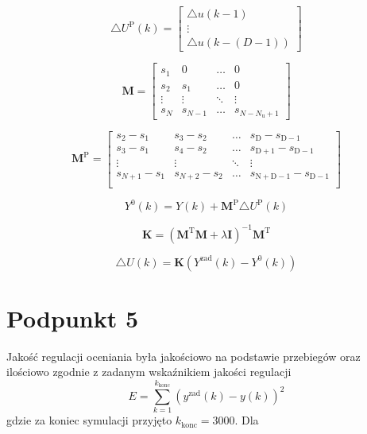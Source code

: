 \begin{equation}
\triangle U^{\mathrm{P}}(k)=\left[
\begin{array}{c}
\triangle u(k-1)\\
\vdots\\
\triangle u(k-(D-1))
\end{array}
\right]
\label{dUp}
\end{equation}

\begin{equation}
\boldsymbol{M}=\left[
\begin{array}
{cccc}
s_{1} & 0 & \ldots & 0\\
s_{2} & s_{1} & \ldots & 0\\
\vdots & \vdots & \ddots & \vdots\\
s_{N} & s_{N-1} & \ldots &  s_{N-N_{\mathrm{u}}+1}
\end{array}
\right]
\label{Marray}
\end{equation}

\begin{equation}
\boldsymbol{M}^{\mathrm{P}}=\left[
\begin{array}
{cccc}
s_{2} - s_{1} & s_{3} - s_{2} & \ldots & s_{\mathrm{D}} - s_{\mathrm{D-1}}\\
s_{3} - s_{1} & s_{4} - s_{2} & \ldots & s_{\mathrm{D+1}} - s_{\mathrm{D-1}}\\
\vdots & \vdots & \ddots & \vdots\\
s_{N+1} - s_{1} & s_{N+2} - s_{2} & \ldots & s_{\mathrm{N+D-1}} - s_{\mathrm{D-1}}\\
\end{array}
\right]
\label{MParray}
\end{equation}

\begin{equation}
Y^{0}(k) = Y(k) + \boldsymbol{M}^{\mathrm{P}} \triangle U^{\mathrm{P}}(k)
\label{Y0k}
\end{equation}

\begin{equation}
\boldsymbol{K} = (\boldsymbol{M}^{\mathrm{T}} \boldsymbol{M} + \lambda \boldsymbol{I})^{-1} \boldsymbol{M}^{\mathrm{T}}
\label{Karray}
\end{equation}

\begin{equation}
\triangle U(k) = \boldsymbol{K}(Y^{\mathrm{zad}}(k) - Y^{0}(k))
\label{dukdmc}
\end{equation}

\chapter{Podpunkt 5}
Jakość regulacji oceniania była jakościowo na podstawie przebiegów oraz ilościowo zgodnie z zadanym wskaźnikiem jakości regulacji
\begin{equation}
E = \sum_{k=1}^{k_{\mathrm{konc}}}(y^{\mathrm{zad}}(k) - y(k))^2
\label{E}
\end{equation}
gdzie za koniec symulacji przyjęto $k_{\mathrm{konc}}=3000$. Dla

